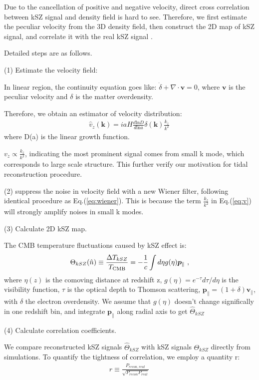 Due to the cancellation of positive and negative velocity, direct cross correlation between kSZ signal and density field is hard to see.
Therefore, we first estimate the peculiar velocity from the 3D density field, 
then construct the 2D map of kSZ signal, 
and correlate it with the real kSZ signal \cite{Shao11}.

Detailed steps are as follows.

(1) Estimate the velocity field:

In linear region, the continuity equation goes like:
$\dot \delta+\nabla \cdot \bm{v}=0$, 
where $\bm{v}$ is the peculiar velocity and $\delta$ is the matter overdensity. 

Therefore, we obtain an estimator of velocity distribution:
\begin{eqnarray}
	\label{eq:v}
\hat v_z(\bm{k})=i a H \frac{d\mathrm{ln}D}{d\mathrm{ln}a}\delta(\bm{k})\frac{k_z}{k^2}\,
\end{eqnarray}
where D(a) is the linear growth function.

$v_z \propto \frac{k_z}{k^2}$, indicating the most prominent signal comes from small k mode, which corresponds to large scale structure. 
This further verify our motivation for tidal reconstruction procedure.

(2) suppress the noise in velocity field with a new Wiener filter, following identical procedure as Eq.(\ref{eq:wiener}). This is because the term $\frac{k_z}{k^2}$ in Eq.(\ref{eq:v}) will strongly amplify noises in small k modes. 

(3) Calculate 2D kSZ map.

The CMB temperature fluctuations caused by kSZ effect is:
\begin{eqnarray}
\label{eq:ksz}
\Theta_{kSZ}(\hat n)\equiv\frac{\Delta T_{kSZ}}{T_{\mathrm{CMB}}}
=-\frac{1}{c}\int d\eta  g(\eta)  \bm{p}_\parallel\ ,
\end{eqnarray}
where $\eta(z)$ is the comoving distance at redshift z, $g(\eta)=e^{-\tau} d\tau/d\eta$ is the visibility function, $\tau$ is the optical depth to Thomson scattering, $\bm{p}_\parallel=(1+\delta)\bm{v}_\parallel$, with $\delta$ the electron overdensity. 
We assume that $g(\eta)$ doesn't change significally in one redshift bin, 
and integrate $\bm{p}_\parallel$ along radial axis to get $\hat \Theta_{kSZ}$

(4) Calculate correlation coefficients.

We compare reconstructed kSZ signals $\hat \Theta_{kSZ}$ with kSZ signals $\Theta_{kSZ}$ directly from simulations. 
To quantify the tightness of correlation, we employ a quantity r: 
\begin{eqnarray}
	r\equiv \frac{P_{recon,real}}{\sqrt{P_{recon}P_{real}}}\,
\end{eqnarray}


